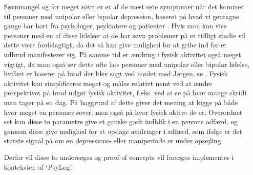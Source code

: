 Søvnmangel og for meget søvn er et af de mest sete symptomer når det kommer til personer med unipolar eller bipolar depression, baseret på hvad vi gentagne gange har hørt fra psykologer, psykiatere og patienter \citep{misc:jorgen-aagaard, misc:janne-rasmussen, misc:faellesrapp}.
Hvis man kan vise personer med en af disse lidelser at de har søvn problemer på et tidligt stadie vil dette være fordelagtigt, da det så kan give mulighed for at gribe ind før et udbrud manifesterer sig.
På samme tid er ændring i fysisk aktivitet også meget vigtigt, da man også ser dette ofte hos personer med unipolar eller bipolar lidelse, hvilket er baseret på hvad der blev sagt ved mødet med Jørgen, se \citep[Kapitel 1, Sektion 4]{misc:faellesrapp}. 
Fysisk aktivitet kan simplificeres meget og måles relativt nemt ved at ændre perspektivet på hvad udgør fysisk aktivitet, f.eks. ved at se på hvor mange skridt man tager på en dag.
På baggrund af dette giver det mening at kigge på både hvor meget en personer sover, men også på hvor fysisk aktive de er.
Overordnet set kan disse to parametre give et ganske godt indblik i en persons adfærd, og gennem disse give mulighed for at opdage ændringer i adfærd, som ifølge \citet{misc:jorgen-aagaard} er det største signal på om en depressions- eller maniperiode er under opsejling. 

Derfor vil disse to undersøges og proof of concepts vil forsøges implementes i konteksten af `PsyLog'.